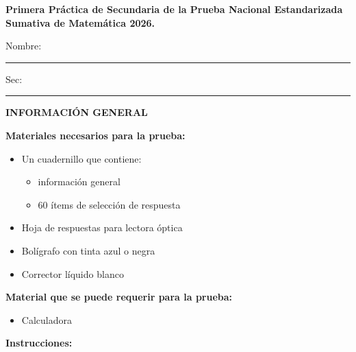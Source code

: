 \documentclass[12pt]{article}
\begin{document}
\begin{center}
{\large \textbf{Primera Pr\'actica de Secundaria de la Prueba Nacional Estandarizada Sumativa de Matem\'atica 2026.}}
\end{center}

\noindent Nombre: \rule{8cm}{0.4pt}\hfill Sec: \rule{3cm}{0.4pt}

\vspace{6pt}
\noindent\textbf{INFORMACI\'ON GENERAL}

\vspace{4pt}
\noindent\textbf{Materiales necesarios para la prueba:}

\begin{itemize}[leftmargin=1.6em, itemsep=1pt, topsep=2pt, parsep=0pt]
  \item Un cuadernillo que contiene:
  \begin{itemize}[leftmargin=1.6em, itemsep=0pt, topsep=1pt, parsep=0pt, label=$\blacklozenge$]
    \item informaci\'on general
    \item 60 \'items de selecci\'on de respuesta
  \end{itemize}
  \item Hoja de respuestas para lectora \'optica
  \item Bol\'igrafo con tinta azul o negra
  \item Corrector l\'iquido blanco
\end{itemize}

\noindent\textbf{Material que se puede requerir para la prueba:}

\begin{itemize}[leftmargin=1.6em, itemsep=1pt, topsep=2pt, parsep=0pt]
  \item Calculadora
\end{itemize}

\vspace{4pt}
\noindent\textbf{Instrucciones:}
\end{document}
